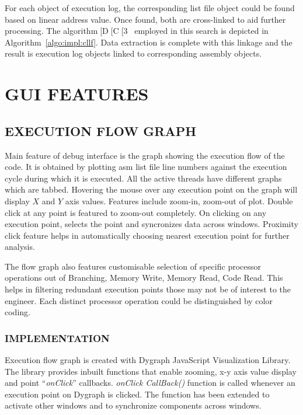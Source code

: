 
For each object of execution log, the corresponding list file object could be found based on linear address value. Once found, both are cross-linked to aid further processing. The algorithm[D[C[3~ employed in this search is depicted in Algorithm~\ref{algo:impl:cllf}. Data extraction is complete with this linkage and the result is execution log objects linked to corresponding assembly objects.

\section {GUI FEATURES}

\subsection {EXECUTION FLOW GRAPH}
Main feature of debug interface is the graph showing the execution flow of the code. It is obtained by plotting asm list file line numbers against the execution cycle during which it is executed. All the active threads have different graphs which are tabbed. Hovering the mouse over any execution point on the graph will display $X$ and $Y$ axis values. Features include zoom-in, zoom-out of plot. Double click at any point is featured to zoom-out completely. On clicking on any execution point, selects the point and syncronizes data across windows. Proximity click feature helps in automatically choosing nearest execution point for further analysis.
 
The flow graph also features customisable selection of specific processor operations out of Branching, Memory Write, Memory Read, Code Read. This helps in filtering redundant execution points those may not be of interest to the engineer. Each distinct processor operation could be distinguished by color coding.   

\subsubsection {IMPLEMENTATION}

Execution flow graph is created with Dygraph JavaScript Visualization Library\cite{http:dygraphs}. The library provides inbuilt functions that enable zooming, x-y axis value display and point ``{\it onClick}'' callbacks. {\it onClick CallBack()} function is called whenever an execution point on Dygraph is clicked. The function has been extended to activate other windows and to synchronize components across windows.


